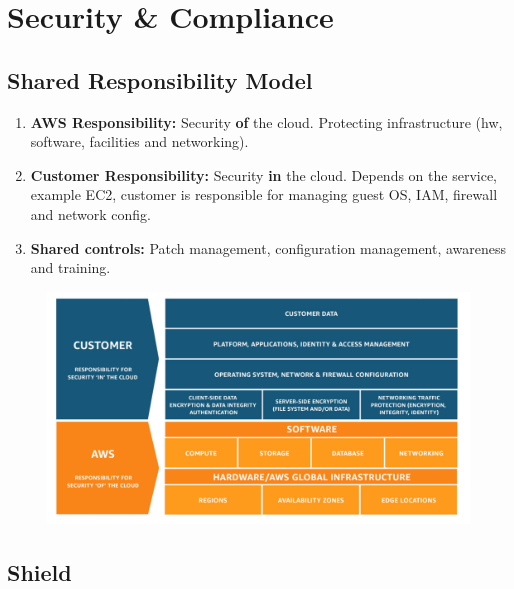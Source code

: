 \section{Security \& Compliance}\label{sec:security-&-compliace}

\subsection{Shared Responsibility Model}\label{subsec:shared-responsibility-model}

\begin{enumerate}
    \item{\textbf{AWS Responsibility:} Security \textbf{of} the cloud}.
        Protecting infrastructure (hw, software, facilities and networking).
    \item{\textbf{Customer Responsibility:} Security \textbf{in} the cloud}.
        Depends on the service, example EC2, customer is responsible for managing guest OS, IAM, firewall
        and network config.
    \item{\textbf{Shared controls:} Patch management, configuration management, awareness and training.}
\end{enumerate}

\begin{figure}[h]
    \includegraphics[scale=0.30]{security-compliance/shared-reponsibility-model}
    \centering
    \label{fig:shared-reponsibility-model}
\end{figure}

\subsection{Shield}\label{subsec:shield}

